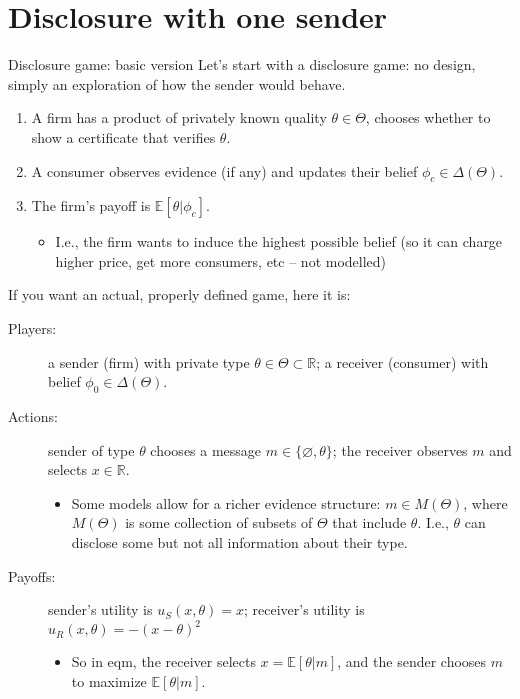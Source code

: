 \documentclass[english,10pt
,aspectratio=169
]{beamer}
\begin{document}
\section{Disclosure with one sender}

\begin{frame}{Disclosure game: basic version \citep{grossman_informational_1981}}
	Let's start with a \alert{disclosure game}: no design, simply an exploration of how the sender would behave.
	\begin{enumerate}[<+->]
		\item A firm has a product of privately known quality $\theta \in \Theta$, chooses whether to show a certificate that verifies $\theta$.
		
		\item A consumer observes evidence (if any) and updates their belief $\phi_c \in \varDelta(\Theta)$.
		
		\item The firm's payoff is $\mathbb{E}[\theta | \phi_c]$.
		\begin{itemize}
			\item I.e., the firm wants to induce the highest possible belief (so it can charge higher price, get more consumers, etc -- not modelled)
		\end{itemize}
	\end{enumerate}
\end{frame}


\begin{frame}
	If you want an actual, properly defined game, here it is:
	\begin{description}
		\item[Players:] a sender (firm) with private type $\theta \in \Theta \subset \mathbb{R}$; a receiver (consumer) with belief $\phi_0 \in \varDelta(\Theta)$.
		\item[Actions:] sender of type $\theta$ chooses a message $m \in \{\varnothing, \theta\}$; the receiver observes $m$ and selects $x \in \mathbb{R}$.
		\begin{itemize}
			\item Some models allow for a richer evidence structure: $m \in M(\Theta)$, where $M(\Theta)$ is some collection of subsets of $\Theta$ that include $\theta$. I.e., $\theta$ can disclose some but not all information about their type. \citep{milgrom_good_1981}
		\end{itemize}
		\item[Payoffs:] sender's utility is $u_S(x,\theta) = x$; receiver's utility is $u_R(x,\theta) = -(x-\theta)^2$
		\begin{itemize}
			\item So in eqm, the receiver selects $x = \mathbb{E}[\theta|m]$, and the sender chooses $m$ to maximize $\mathbb{E}[\theta|m]$.
		\end{itemize}
	\end{description}
\end{frame}
\end{document}

